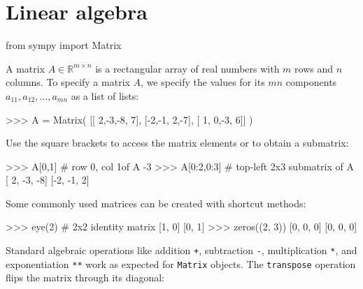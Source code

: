 




\section{Linear algebra}
\label{sec:linear_algebra}



\small
\begin{verbatimtab}
from sympy import Matrix
\end{verbatimtab}
\normalsize

\noindent
A matrix $A \in \mathbb{R}^{m\times n}$ is a rectangular array of real numbers with $m$ rows and $n$ columns.
To specify a matrix $A$, we specify the values for its $mn$ components $a_{11}, a_{12}, \ldots, a_{mn}$
as a list of lists:

\small
\begin{verbatimtab}
>>> A = Matrix( [[ 2,-3,-8, 7],
                 [-2,-1, 2,-7],
                 [ 1, 0,-3, 6]] )
\end{verbatimtab}
\normalsize

\noindent
Use the square brackets to access the matrix elements or to obtain a submatrix:



\small
\begin{verbatimtab}
>>> A[0,1]            # row 0, col 1of A 
-3
>>> A[0:2,0:3]        # top-left 2x3 submatrix of A 
[ 2, -3, -8]
[-2, -1,  2]
\end{verbatimtab}
\normalsize

\noindent
Some commonly used matrices can be created with shortcut methods:



\small
\begin{verbatimtab}
>>> eye(2)            # 2x2 identity matrix
[1, 0]
[0, 1]
>>> zeros((2, 3))
[0, 0, 0]
[0, 0, 0]
\end{verbatimtab}
\normalsize



\noindent
Standard algebraic operations like 
addition \texttt{+}, subtraction \texttt{-}, multiplication \texttt{*},
and exponentiation \texttt{**} work as expected for \texttt{Matrix} objects.
%
The \texttt{transpose} operation flips the matrix through its diagonal:

